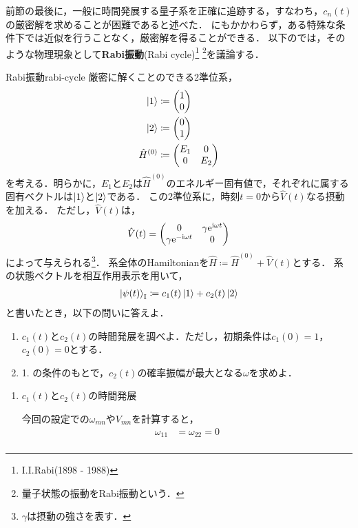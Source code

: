 \documentclass{report}
\begin{document}
  前節の最後に，一般に時間発展する量子系を正確に追跡する，すなわち，$c_n(t)$の厳密解を求めることが困難であると述べた．
  にもかかわらず，ある特殊な条件下では近似を行うことなく，厳密解を得ることができる．
  以下のでは，そのような物理現象として\textbf{Rabi振動}(Rabi cycle)\footnote{I.I.Rabi(1898 - 1988)}
  \footnote{量子状態の振動をRabi振動という．}を議論する．
  \begin{myex}{Rabi振動}{rabi-cycle}
    厳密に解くことのできる2準位系，
    \begin{align}
      \ket{1} &\coloneqq \mqty(1\\ 0) \\
      \ket{2} &\coloneqq \mqty(0\\ 1) \\
      \hat{H}^{(0)} &\coloneqq \mqty(E_1 & 0\\ 0 & E_2)
    \end{align}
    を考える．明らかに，$E_1$と$E_2$は$\hat{H}^{(0)}$のエネルギー固有値で，それぞれに属する固有ベクトルは$\ket{1}$と$\ket{2}$である．
    この2準位系に，時刻$t = 0$から$\hat{V}(t)$なる摂動を加える．
    ただし，$\hat{V}(t)$は，
    \begin{align}
      \hat{V}(t) = \mqty(
        0 & \gamma\e^{\i\omega t} \\
        \gamma\e^{-\i\omega t} & 0
      )
    \end{align}
    によって与えられる\footnote{$\gamma$は摂動の強さを表す．}．
    系全体のHamiltonianを$\hat{H} \coloneqq \hat{H}^{(0)} + \hat{V}(t)$とする．
    系の状態ベクトルを相互作用表示を用いて，
    \begin{align}
      \ket{\psi(t)}_{\mathrm{I}} \coloneqq c_1(t)\ket{1} + c_2(t)\ket{2}
    \end{align}
    と書いたとき，以下の問いに答えよ．
    \begin{enumerate}
      \item $c_1(t)$と$c_2(t)$の時間発展を調べよ．ただし，初期条件は$c_1(0) = 1$，$c_2(0) = 0$とする．
      \item 1. の条件のもとで，$c_2(t)$の確率振幅が最大となる$\omega$を求めよ．
    \end{enumerate}
    \tcblower
    \begin{enumerate}
      \item $c_1(t)$と$c_2(t)$の時間発展\par
        今回の設定での$\omega_{mn}$や$V_{mn}$を計算すると，
        \begin{align}
          \omega_{11} &= \omega_{22} = 0 \\ 

\end{align}
\end{enumerate}
\end{myex}
\end{document}
